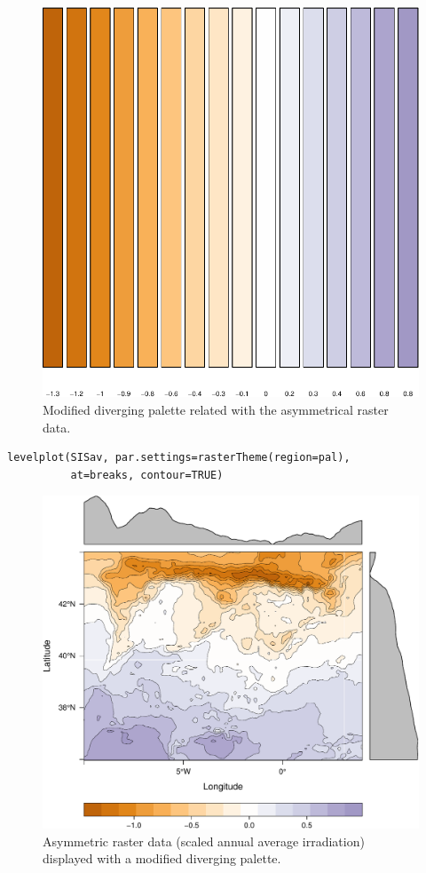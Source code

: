 \documentclass[smallroyalvopaper]{memoir}
\begin{document}
\begin{figure}[htb]
\centering
\includegraphics[height=0.3\textheight]{figs/showBreak2Pal.pdf}
\caption{\label{fig:showBreak2Pal}Modified diverging palette related with the asymmetrical raster data.}
\end{figure}


\lstset{language=R,numbers=none}
\begin{lstlisting}
levelplot(SISav, par.settings=rasterTheme(region=pal),
          at=breaks, contour=TRUE)
\end{lstlisting}

\begin{figure}[htb]
\centering
\includegraphics[width=.9\linewidth]{figs/divPalSISav.pdf}
\caption{\label{fig:divPalSISav}Asymmetric raster data (scaled annual average irradiation) displayed with a modified diverging palette.}
\end{figure}
\end{document}
